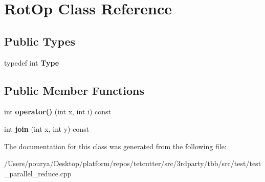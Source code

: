 \hypertarget{classRotOp}{}\section{Rot\+Op Class Reference}
\label{classRotOp}
\subsection*{Public Types}
\begin{DoxyCompactItemize}
\item 
\hypertarget{classRotOp_ab05d0ebb40cef7cbd00308c10fb44223}{}typedef int {\bfseries Type}\label{classRotOp_ab05d0ebb40cef7cbd00308c10fb44223}

\end{DoxyCompactItemize}
\subsection*{Public Member Functions}
\begin{DoxyCompactItemize}
\item 
\hypertarget{classRotOp_a50d674be8014777644baffedca1074bc}{}int {\bfseries operator()} (int x, int i) const \label{classRotOp_a50d674be8014777644baffedca1074bc}

\item 
\hypertarget{classRotOp_a1b6e54f98426af5458797998ab53016a}{}int {\bfseries join} (int x, int y) const \label{classRotOp_a1b6e54f98426af5458797998ab53016a}

\end{DoxyCompactItemize}


The documentation for this class was generated from the following file\+:\begin{DoxyCompactItemize}
\item 
/\+Users/pourya/\+Desktop/platform/repos/tetcutter/src/3rdparty/tbb/src/test/test\+\_\+parallel\+\_\+reduce.\+cpp\end{DoxyCompactItemize}
